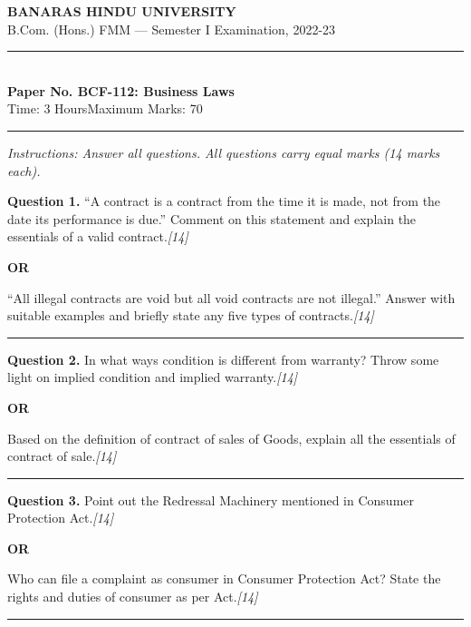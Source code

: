 \documentclass[11pt,a4paper]{article}
\newcommand{\pts}[1]{\hfill   \textit{[#1]}}
\begin{document}
\begin{center}
  {\large\bfseries BANARAS HINDU UNIVERSITY}\\[2pt]
  {\normalsize B.Com. (Hons.) FMM --- Semester I Examination, 2022-23}\\[6pt]
  \rule{0.8\linewidth}{0.5pt}\\[6pt]
  {\large\bfseries Paper No. BCF-112: Business Laws}\\[4pt]
  {\normalsize Time: 3 Hours\hfill Maximum Marks: 70}
\end{center}

\rule{\linewidth}{0.4pt}

\smallskip



\noindent   \textit{Instructions: Answer all questions. All questions carry equal marks (14 marks each).}

\bigskip




\noindent   \textbf{Question 1.}
``A contract is a contract from the time it is made, not from the date its performance is due.'' Comment on this statement and explain the essentials of a valid contract.\pts{14}

\centerline{   \textbf{OR}}

``All illegal contracts are void but all void contracts are not illegal.'' Answer with suitable examples and briefly state any five types of contracts.\pts{14}

\medskip\rule{\linewidth}{0.2pt}




\noindent   \textbf{Question 2.}
In what ways condition is different from warranty? Throw some light on implied condition and implied warranty.\pts{14}

\centerline{   \textbf{OR}}

Based on the definition of contract of sales of Goods, explain all the essentials of contract of sale.\pts{14}

\medskip\rule{\linewidth}{0.2pt}




\noindent   \textbf{Question 3.}
Point out the Redressal Machinery mentioned in Consumer Protection Act.\pts{14}

\centerline{   \textbf{OR}}

Who can file a complaint as consumer in Consumer Protection Act? State the rights and duties of consumer as per Act.\pts{14}

\medskip\rule{\linewidth}{0.2pt}
\end{document}
